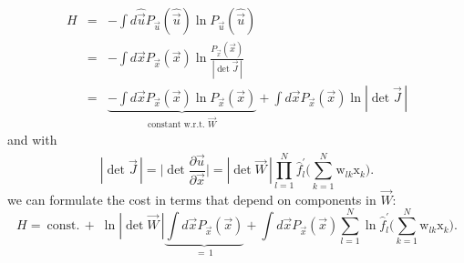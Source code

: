 \begin{frame}


\begin{eqnarray}
H & = & -\int d \widehat{\vec{u}} P_{\vec{u}} (\widehat{\vec{u}})
  \ln P_{\vec{u}} (\widehat{\vec{u}}) \\
& = &  
-\int d \vec{x} P_{\vec{x}} (\vec{x}) \ln \frac{P_{\vec{x}}(\vec{x})}{|\det \vec{J}\,|} \\
& = & 
\underbrace{
    -\int d \vec{x} P_{\vec{x}} (\vec{x}) \ln P_{\vec{x}}(\vec{x})
}_{ \text{constant w.r.t. } \vec W } 
    + \int d \vec{x} P_{\vec{x}} (\vec{x}) \ln |\det \vec{J}\,|
\end{eqnarray}
and with \notesonly{\eqref{eq:functionalDeterminant}}
\slidesonly{
	\begingroup
	\footnotesize
}
\begin{equation} \label{eq:functionalDeterminant}
|\det \vec {J}\,| = 
	\Big| \det \frac{\partial \widehat{\vec{u}}}{\partial \vec{x}} \Big|
	= |\det \vec{W}\, | \prod\limits_{l = 1}^N  \widehat{f}_l^{'} \Bigg( 
		\sum\limits_{k = 1}^N \mathrm{w}_{lk} \mathrm{x}_k \Bigg).
\end{equation}
\slidesonly{
	\endgroup
}
we can formulate the cost 
in terms that depend on components in $\vec W$:
\begin{equation}
	H =~\text{const.} \, + \; \ln |\det \vec{W}\,| \underbrace{\int d \vec{x} P_{\vec{x}} (\vec{x})}_{=\,1}
		+ \int d \vec{x} P_{\vec{x}} (\vec{x}) \sum\limits_{l = 1}^N
			\ln \widehat{f}_l^{'} \Bigg( \sum\limits_{k = 1}^N 
			\mathrm{w}_{lk} \mathrm{x}_k \Bigg).
\end{equation}

\end{frame}

